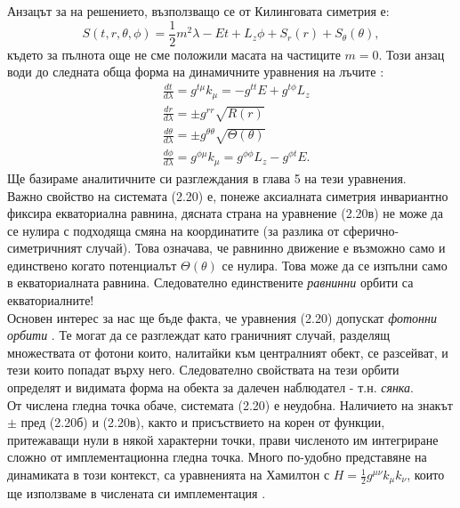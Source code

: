 Анзацът за на решението, възползващо се от Килинговата симетрия е:
\begin{equation}
	S(t,r,\theta,\phi) = \frac{1}{2}m^2\lambda -Et + L_z\phi + S_r(r) + S_\theta(\theta),
\end{equation}
където за пълнота още не сме положили масата на частиците $m = 0$. Този анзац води до следната обща форма на динамичните уравнения на лъчите \cite{Chandrasekhar}\cite{Wang2019}\cite{Gyulchev2018}:
\begin{subequations}
	\begin{align}
		&\frac{dt}{d\lambda} = g^{t\mu}k_\mu = -g^{tt}E + g^{t\phi}L_z\\
		&\frac{dr}{d\lambda} = \pm g^{rr}\sqrt{R(r)}\\
		&\frac{d\theta}{d\lambda} = \pm g^{\theta\theta}\sqrt{\Theta(\theta)}\\
		&\frac{d\phi}{d\lambda} = g^{\phi\mu}k_\mu = g^{\phi\phi}L_z - g^{\phi t}E.
	\end{align}
\end{subequations}
Ще базираме аналитичните си разглеждания в глава 5 на тези уравнения.\\\newline
Важно свойство на системата (2.20) е, понеже аксиалната симетрия инвариантно фиксира екваториална равнина, дясната страна на уравнение (2.20в) не може да се нулира с подходяща смяна на координатите (за разлика от сферично-симетричният случай). Това означава, че равнинно движение е възможно само и единствено когато потенциалът $\Theta(\theta)$ се нулира. Това може да се изпълни само в екваториалната равнина. Следователно единствените \emph{равнинни} орбити са екваториалните!\\

Основен интерес за нас ще бъде факта, че уравнения (2.20) допускат \emph{фотонни орбити} \cite{Teo}. Те могат да се разглеждат като граничният случай, разделящ множествата от фотони които, налитайки към централният обект, се разсейват, и тези които попадат върху него. Следователно свойствата на тези орбити определят и видимата форма на обекта за далечен наблюдател - т.н. \emph{сянка}.\\

\noindent От числена гледна точка обаче, системата (2.20) е неудобна. Наличието на знакът $\pm$ пред (2.20б) и (2.20в), както и присъствието на корен от функции, притежаващи нули в някой характерни точки, прави численото им интегриране сложно от имплементационна гледна точка. Много по-удобно представяне на динамиката в този контекст, са уравненията на Хамилтон с $H = \frac{1}{2}g^{\mu\nu}k_\mu k_\nu$, които ще използваме в числената си имплементация \cite{James_2015}.

